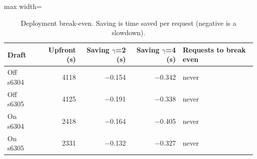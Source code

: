 \begin{table}[!htb]
\centering
\scriptsize
\setlength{\tabcolsep}{3.5pt}
\caption{Deployment break-even. Saving is time saved per request (negative is a slowdown).}
\label{tab:t3deploy}
\begin{adjustbox}{max width=\linewidth}
\begin{tabular}{lrrrl}
\toprule
Draft & Upfront (s) & Saving $\gamma$=2 (s) & Saving $\gamma$=4 (s) & Requests to break even \\
\midrule
Off s6304 & 4118 & $-$0.154 & $-$0.342 & never \\
Off s6305 & 4125 & $-$0.191 & $-$0.338 & never \\
On s6304 & 2418 & $-$0.164 & $-$0.405 & never \\
On s6305 & 2331 & $-$0.132 & $-$0.327 & never \\
\bottomrule
\end{tabular}
\end{adjustbox}
\end{table}
